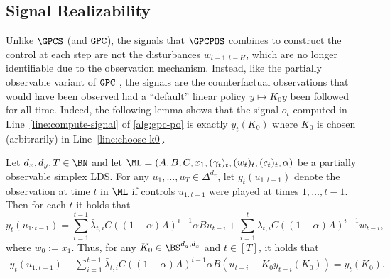 \subsection{Signal Realizability}
Unlike $\GPCS$ (and $\texttt{GPC}$), the signals that $\GPCPOS$ combines to construct the control at each step are not the disturbances $w_{t-1:t-H}$, which are no longer identifiable due to the observation mechanism. Instead, like the partially observable variant of $\texttt{GPC}$ \cite[Chapter 9]{hazan2022introduction}, the signals are the counterfactual observations that would have been observed had a ``default'' linear policy $y \mapsto K_0 y$ been followed for all time. Indeed, the following lemma shows that the signal $o_t$ computed in Line~\ref{line:compute-signal} of \cref{alg:gpc-po} is exactly $y_t(K_0)$ where $K_0$ is chosen (arbitrarily) in Line~\ref{line:choose-k0}.

\begin{lemma} 
\label{lemma:signal-realizability}
Let $d_x,d_y,T \in \BN$ and let $\ML = (A,B,C,x_1,(\gamma_t)_t,(w_t)_t,(c_t)_t,\alpha)$ be a partially observable simplex LDS. For any $u_1,\dots,u_T \in \Delta^{d_x}$, let $y_t(u_{1:t-1})$ denote the observation at time $t$ in $\ML$ if controls $u_{1:t-1}$ were played at times $1,\dots,t-1$. Then for each $t$ it holds that
\begin{equation} y_t(u_{1:t-1}) = \sum_{i=1}^{t-1} \bar\lambda_{t,i}C((1-\alpha)A)^{i-1}\alpha Bu_{t-i} + \sum_{i=1}^t \lambda_{t,i}C((1-\alpha)A)^{i-1} w_{t-i},\label{eq:yt-unfold-po}\end{equation}
where $w_0:=x_1$.
Thus, for any $K_0 \in \BS^{d_y,d_x}$ and $t \in [T]$, it holds that
\begin{align}
  \label{eq:yt-unfold-po-2}y_t(u_{1:t-1}) - \sum_{i=1}^{t-1} \bar\lambda_{t,i}C((1-\alpha)A)^{i-1}\alpha B(u_{t-i} - K_0 y_{t-i}(K_0)) = y_t(K_0).\end{align}
\end{lemma}

